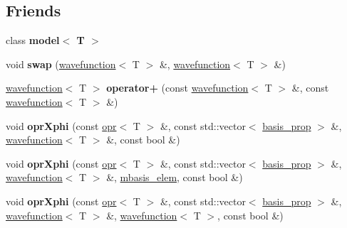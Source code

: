 \subsection*{Friends}
\begin{DoxyCompactItemize}
\item 
\mbox{\label{classqbasis_1_1wavefunction_a4ddaa0e3eeb5f16ab585095f2dba8da1}} 
class {\bfseries model$<$ T $>$}
\item 
\mbox{\label{classqbasis_1_1wavefunction_a37fd49e775817d3d54798c902b38155e}} 
void {\bfseries swap} (\hyperlink{classqbasis_1_1wavefunction}{wavefunction}$<$ T $>$ \&, \hyperlink{classqbasis_1_1wavefunction}{wavefunction}$<$ T $>$ \&)
\item 
\mbox{\label{classqbasis_1_1wavefunction_a53ec891c23b2c014fcbdd6290f5cf679}} 
\hyperlink{classqbasis_1_1wavefunction}{wavefunction}$<$ T $>$ {\bfseries operator+} (const \hyperlink{classqbasis_1_1wavefunction}{wavefunction}$<$ T $>$ \&, const \hyperlink{classqbasis_1_1wavefunction}{wavefunction}$<$ T $>$ \&)
\item 
\mbox{\label{classqbasis_1_1wavefunction_a938733638028a298418622998077db12}} 
void {\bfseries opr\+Xphi} (const \hyperlink{classqbasis_1_1opr}{opr}$<$ T $>$ \&, const std\+::vector$<$ \hyperlink{classqbasis_1_1basis__prop}{basis\+\_\+prop} $>$ \&, \hyperlink{classqbasis_1_1wavefunction}{wavefunction}$<$ T $>$ \&, const bool \&)
\item 
\mbox{\label{classqbasis_1_1wavefunction_ac881f7f2c19ae767ca695ec696526f3b}} 
void {\bfseries opr\+Xphi} (const \hyperlink{classqbasis_1_1opr}{opr}$<$ T $>$ \&, const std\+::vector$<$ \hyperlink{classqbasis_1_1basis__prop}{basis\+\_\+prop} $>$ \&, \hyperlink{classqbasis_1_1wavefunction}{wavefunction}$<$ T $>$ \&, \hyperlink{classqbasis_1_1mbasis__elem}{mbasis\+\_\+elem}, const bool \&)
\item 
\mbox{\label{classqbasis_1_1wavefunction_a453118abdd7bb3e60a43d8bf6b871562}} 
void {\bfseries opr\+Xphi} (const \hyperlink{classqbasis_1_1opr}{opr}$<$ T $>$ \&, const std\+::vector$<$ \hyperlink{classqbasis_1_1basis__prop}{basis\+\_\+prop} $>$ \&, \hyperlink{classqbasis_1_1wavefunction}{wavefunction}$<$ T $>$ \&, \hyperlink{classqbasis_1_1wavefunction}{wavefunction}$<$ T $>$, const bool \&)

\end{DoxyCompactItemize}
